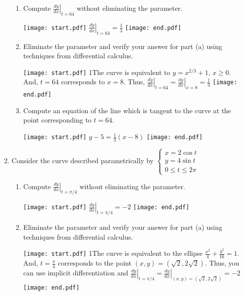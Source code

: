 \documentclass[12pt]{article}
\begin{document}
\begin{enumerate}
\begin{enumerate}
\item Compute $\left.\frac{dy}{dx}\right|_{t=64}$ without eliminating the parameter.

\texttt{[image: start.pdf]}
{{$\left.\frac{dy}{dx}\right|_{t=64}=\frac{1}{3}$}}
\texttt{[image: end.pdf]}


\newpage

\item Eliminate the parameter and verify your answer for part (a) using techniques from differential calculus.

\texttt{[image: start.pdf]}
{{{1\linewidth}{The curve is equivalent to $y=x^{2/3}+1$, $x \geq 0$.  And, $t=64$ corresponds to $x=8$.  Thus, $\left.\frac{dy}{dx}\right|_{t=64}=\left.\frac{dy}{dx}\right|_{x=8}=\frac{1}{3}$}}}
\texttt{[image: end.pdf]}


\item Compute an equation of the line which is tangent to the curve at the point corresponding to $t=64$.

\texttt{[image: start.pdf]}
{{$y-5=\frac{1}{3}(x-8)$}}
\texttt{[image: end.pdf]}


\end{enumerate}

\item Consider the curve described parametrically by $\left\{\begin{array}{l}
x=2\cos{t}\\
y=4\sin{t}\\
0 \leq t \leq 2\pi \end{array}\right.$

\begin{enumerate}

\item Compute $\left.\frac{dy}{dx}\right|_{t=\pi/4}$ without eliminating the parameter.

\texttt{[image: start.pdf]}
{{$\left.\frac{dy}{dx}\right|_{t=\pi/4}=-2$}}
\texttt{[image: end.pdf]}


\item Eliminate the parameter and verify your answer for part (a) using techniques from differential calculus.

\texttt{[image: start.pdf]}
{{{1\linewidth}{The curve is equivalent to the ellipse $\frac{x^2}{4}+\frac{y^2}{16}=1$.  And, $t=\frac{\pi}{4}$ corresponds to the point $(x,y)=(\sqrt{2},2\sqrt{2})$.  Thus, you can use implicit differentiation and $\left.\frac{dy}{dx}\right|_{t=\pi/4}=\left.\frac{dy}{dx}\right|_{(x,y)=\left(\sqrt{2},2\sqrt{2}\right)}=-2$}}}
\texttt{[image: end.pdf]}



\end{enumerate}
\end{enumerate}
\end{document}
